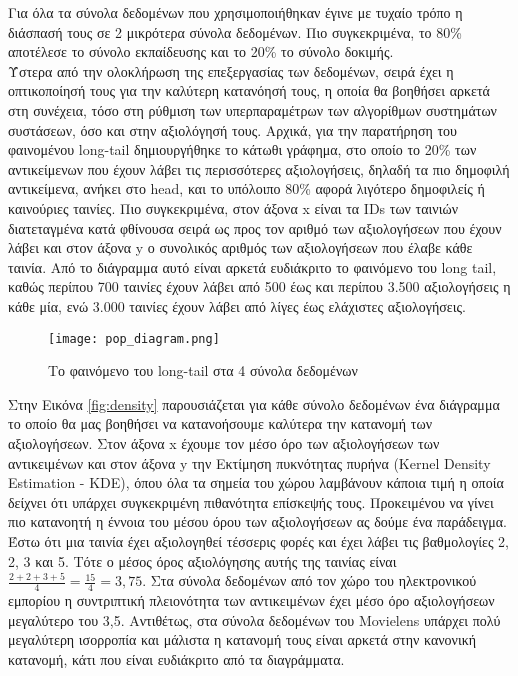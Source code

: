 \noindent Για όλα τα σύνολα δεδομένων που χρησιμοποιήθηκαν έγινε με τυχαίο τρόπο η διάσπασή τους σε 2 μικρότερα σύνολα δεδομένων. Πιο συγκεκριμένα, το 80\% αποτέλεσε το σύνολο εκπαίδευσης και το 20\% το σύνολο δοκιμής.\\
Ύστερα από την ολοκλήρωση της επεξεργασίας των δεδομένων, σειρά έχει η οπτικοποίησή τους για την καλύτερη κατανόησή τους, η οποία θα βοηθήσει αρκετά στη συνέχεια, τόσο στη ρύθμιση των υπερπαραμέτρων των αλγορίθμων συστημάτων συστάσεων, όσο και στην αξιολόγησή τους.
 \noindent Αρχικά, για την παρατήρηση του φαινομένου long-tail δημιουργήθηκε το κάτωθι γράφημα, στο οποίο το 20\% των αντικείμενων που έχουν λάβει τις περισσότερες αξιολογήσεις, δηλαδή τα πιο δημοφιλή αντικείμενα, ανήκει στο head, και το υπόλοιπο 80\% αφορά λιγότερο δημοφιλείς ή καινούριες ταινίες. Πιο συγκεκριμένα, στον άξονα x είναι τα IDs των ταινιών διατεταγμένα κατά φθίνουσα σειρά ως προς τον αριθμό των αξιολογήσεων που έχουν λάβει και στον άξονα y ο συνολικός αριθμός των αξιολογήσεων που έλαβε κάθε ταινία. Από το διάγραμμα αυτό είναι αρκετά ευδιάκριτο το φαινόμενο του long tail, καθώς περίπου 700 ταινίες έχουν λάβει από 500 έως και περίπου 3.500 αξιολογήσεις η κάθε μία, ενώ 3.000 ταινίες έχουν λάβει από λίγες έως ελάχιστες αξιολογήσεις.
 \begin{figure}[H]
 	\centering
 	\texttt{[image: pop\_diagram.png]}
 	\caption{Το φαινόμενο του long-tail στα 4 σύνολα δεδομένων}
 	\label{fig:pop}
 	\vspace{-5.50mm}
 \end{figure}
\vspace{0.00mm}
 \noindent Στην Εικόνα \ref{fig:density} παρουσιάζεται για κάθε σύνολο δεδομένων ένα διάγραμμα το οποίο θα μας βοηθήσει να κατανοήσουμε καλύτερα την κατανομή των αξιολογήσεων. Στον άξονα x έχουμε τον μέσο όρο των αξιολογήσεων των αντικειμένων και στον άξονα y την Εκτίμηση πυκνότητας πυρήνα (Kernel Density Estimation - KDE), όπου όλα τα σημεία του χώρου λαμβάνουν κάποια τιμή η οποία δείχνει ότι υπάρχει συγκεκριμένη πιθανότητα επίσκεψής τους. Προκειμένου να γίνει πιο κατανοητή η έννοια του μέσου όρου των αξιολογήσεων ας δούμε ένα παράδειγμα. Έστω ότι μια ταινία έχει αξιολογηθεί τέσσερις φορές και έχει λάβει τις βαθμολογίες 2, 2, 3 και 5. Τότε ο μέσος όρος αξιολόγησης αυτής της ταινίας είναι $ \frac{2+2+3+5}{4} = \frac{15}{4}=3,75 $.
Στα σύνολα δεδομένων από τον χώρο του ηλεκτρονικού εμπορίου η συντριπτική πλειονότητα των αντικειμένων έχει μέσο όρο αξιολογήσεων μεγαλύτερο του 3,5. Αντιθέτως, στα σύνολα δεδομένων του Movielens υπάρχει πολύ μεγαλύτερη ισορροπία και μάλιστα η κατανομή τους είναι αρκετά στην κανονική κατανομή, κάτι που είναι ευδιάκριτο από τα διαγράμματα.
